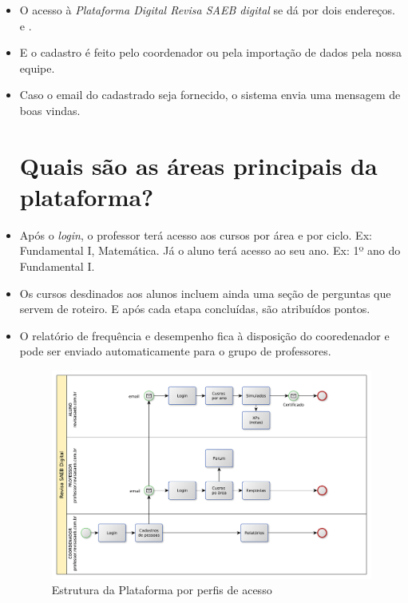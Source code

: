 \begin{itemize}
\item O acesso à \textit{Plataforma Digital Revisa SAEB digital} se dá por dois endereços.  e .

\item E o cadastro é feito pelo coordenador ou pela importação de dados pela nossa equipe.

\item Caso o email do cadastrado seja fornecido, o sistema envia uma mensagem de boas vindas. 

\section{Quais são as áreas principais da plataforma?}

\item Após o \textit{login}, o professor terá acesso aos cursos por área e por ciclo. Ex:
Fundamental I, Matemática. Já o aluno terá acesso ao seu ano. Ex: 1º ano do Fundamental I.

\item Os cursos desdinados aos alunos incluem ainda uma seção de perguntas que servem de roteiro.
E após cada etapa concluídas, são atribuídos pontos. 

\item O relatório de frequência e desempenho fica à disposição do cooredenador e pode ser 
enviado automaticamente para o grupo de professores. 
\begin{figure}[t]
\includegraphics[width=\textwidth]{imgs/bpmn}
\caption{Estrutura da Plataforma por perfis de acesso}
\end{figure}

\end{itemize}

